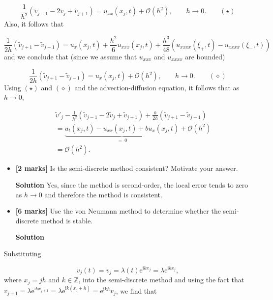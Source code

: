 \documentclass[12pt,a4paper]{article}
\begin{document}
\begin{equation}
\frac{1}{h^2}\left(\widetilde{v}_{j-1} - 2\widetilde{v}_j + \widetilde{v}_{j+1}   \right) = u_{xx}(x_j,t) + \mathcal{O}\left(h^2\right), \qquad h \to 0. \qquad (\star)
\end{equation}
Also, it follows that


\begin{equation*}
\frac{1}{2h}\left(\widetilde{v}_{j+1} - \widetilde{v}_{j-1}   \right) = u_{x}(x_j,t) + \frac{h^2}{6}u_{xxx} (x_j,t) + \frac{h^3}{48}\left(u_{xxxx} (\xi_+,t) - u_{xxxx} (\xi_-,t)  \right)
\end{equation*}
and we conclude that (since we assume that $u_{xxx}$ and $u_{xxxx}$ are bounded)


\begin{equation}
\frac{1}{2h}\left(\widetilde{v}_{j+1} - \widetilde{v}_{j-1}   \right) = u_{x}(x_j,t) + \mathcal{O}\left(h^2\right), \qquad h \to 0. \qquad (\diamond)
\end{equation}
Using $(\star)$ and $(\diamond)$ and the advection-diffusion equation, it follows that as $h \to 0$,


\begin{eqnarray*}
&& \widetilde{v}'_j - \frac{1}{h^2}\left(\widetilde{v}_{j-1} - 2\widetilde{v}_j + \widetilde{v}_{j+1}   \right) + \frac{b}{2h}\left(\widetilde{v}_{j+1}  - \widetilde{v}_{j-1}   \right) \\
&& = \underbrace{u_t(x_j,t) - u_{xx}(x_j,t) + bu_{x}(x_j,t)}_{=\: 0} +  \mathcal{O}\left(h^2\right) \\
&& = \mathcal{O}\left(h^2\right).
\end{eqnarray*}
\begin{itemize}
\item[6. ] \textbf{[2 marks]} Is the semi-discrete method consistent?  Motivate your answer.

\textbf{Solution} Yes, since the method is second-order, the local error tends to zero as $h \to 0$ and therefore the method is consistent.


\item[7. ] \textbf{[6 marks]} Use the von Neumann method to determine whether the semi-discrete method is stable.

\textbf{Solution} 

\end{itemize}
Substituting

\[
v_j(t) = v_j = \lambda(t)\mathrm{e}^{{\mathrm{i}}kx_j} = \lambda \mathrm{e}^{{\mathrm{i}}kx_j},
\]
where $x_j = jh$ and $k \in \mathbb{Z}$, into the semi-discrete method and using the fact that $v_{j+1} = \lambda \mathrm{e}^{{\mathrm{i}}kx_{j+1}} = \lambda \mathrm{e}^{{\mathrm{i}}k(x_{j}+h)} = \mathrm{e}^{{\mathrm{i}}kh}v_j$, we find that
\end{document}
